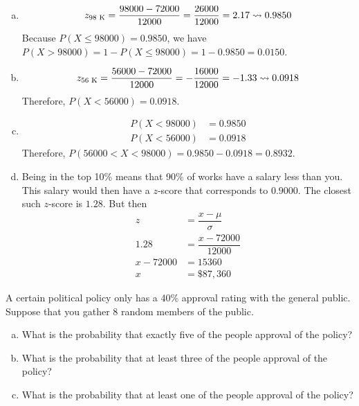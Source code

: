\documentclass[11pt,letterpaper]{article}
\begin{document}
\sol
\begin{enumerate}[(a)]
\item 
	\[
	z_{\text{98 K}}= \dfrac{98000 - 72000}{12000}= \dfrac{26000}{12000}= 2.17 \rightsquigarrow 0.9850
	\]
Because $P(X \leq 98000)= 0.9850$, we have $P(X > 98000)= 1 - P(X \leq 98000)= 1 - 0.9850= 0.0150$. 

\item 
	\[
	z_{\text{56 K}}= \dfrac{56000 - 72000}{12000}= -\dfrac{16000}{12000}= -1.33 \rightsquigarrow 0.0918
	\]
Therefore, $P(X < 56000)= 0.0918$. 

\item 
	\[
	\begin{aligned}
	P(X < 98000)&= 0.9850 \\
	P(X < 56000)&= 0.0918
	\end{aligned}
	\]
Therefore, $P(56000 < X < 98000)= 0.9850 - 0.0918= 0.8932$.

\item Being in the top 10\% means that 90\% of works have a salary less than you. This salary would then have a $z$-score that corresponds to $0.9000$. The closest such $z$-score is $1.28$. But then
	\[
	\begin{aligned}
	z&= \dfrac{x - \mu}{\sigma} \\
	1.28&= \dfrac{x - 72000}{12000} \\
	x - 72000&= 15360 \\
	x&= \$87,360
	\end{aligned}
	\]
\end{enumerate}





\newpage





 A certain political policy only has a 40\% approval rating with the general public. Suppose that you gather 8 random members of the public. 
	\begin{enumerate}[(a)]
	\item What is the probability that exactly five of the people approval of the policy?
	\item What is the probability that at least three of the people approval of the policy?
	\item What is the probability that at least one of the people approval of the policy? 
	\end{enumerate} \pspace
\end{document}
